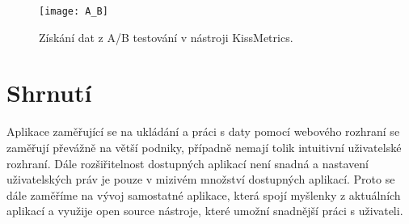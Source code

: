 \begin{figure}[htp]
\centering
\texttt{[image: A\_B]}
\caption{Získání dat z A/B testování v nástroji KissMetrics.}
\label{ab-fig}
\end{figure}

\section{Shrnutí}
\par Aplikace zaměřující se na ukládání a práci s daty pomocí webového rozhraní se zaměřují převážně na větší podniky, případně nemají tolik intuitivní uživatelské rozhraní. Dále rozšiřitelnost dostupných aplikací není snadná a nastavení uživatelských práv je pouze v mizivém množství dostupných aplikací. Proto se dále zaměříme na vývoj samostatné aplikace, která spojí myšlenky z aktuálních aplikací a využije open source nástroje, které umožní snadnější práci s uživateli.
